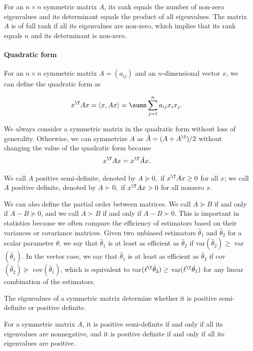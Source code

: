 For an $n\times n$ symmetric matrix $A$, its rank equals the number of non-zero eigenvalues
and its determinant equals the product of all eigenvalues. The matrix
$A$ is of full rank if all its eigenvalues are non-zero, which implies
that its rank equals $n$ and its determinant is non-zero.



\paragraph*{Quadratic form}

For an $n\times n$ symmetric matrix $A=(a_{ij})$ and an $n$-dimensional
vector $x$, we can define the quadratic form as

\[
x^{\T}Ax=\langle x,Ax \rangle =\sumn\sum_{j=1}^{n}a_{ij}x_{i}x_{j}.
\]

We always consider a symmetric matrix in the quadratic form without
loss of generality. Otherwise, we can  symmetrize $A$ as $ \tilde{A} =  (A+A^{\T})/2$
without changing the value of the quadratic form because
\[
x^{\T}Ax=x^{\T}  \tilde{A}  x.
\]
 

We call $A$ positive semi-definite, denoted by $A\succeq 0,$ if $x^{\T}Ax\ge0$
for all $x$; we call $A$ positive definite, denoted by $A\succ 0,$
if $x^{\T}Ax>0$ for all nonzero $x.$


We can also define the partial order between matrices. We call $A\succeq B$
if and only if $A-B\succeq0$, and we call $A\succ B$ if and only
if $A-B\succ0$. This is important in statistics because we often
compare the efficiency of estimators based on their variances or covariance matrices. Given two unbiased estimators $\hat\theta_1$ and $\hat\theta_2$ for a scalar parameter $\theta$, we say that $\hat\theta_1$ is at least as efficient as $\hat\theta_2$ if var$(\hat\theta_2) \geq $ var$(\hat\theta_1)$. In the vector case, we say that $\hat\theta_1$ is at least as efficient as $\hat\theta_2$  if cov$(\hat\theta_2) \succeq $ cov$(\hat\theta_1)$, which is equivalent to var$(\ell^{\T} \hat\theta_2) \geq $ var$(\ell^{\T}\hat\theta_1)$ for any linear combination of the estimators. 



The eigenvalues of a symmetric matrix determine whether it is positive semi-definite or positive definite. 


\begin{theorem}
For a symmetric matrix $A$, it is positive semi-definite
if and only if all its eigenvalues are nonnegative, and it is positive
definite if and only if all its eigenvalues are positive.
\end{theorem} 





